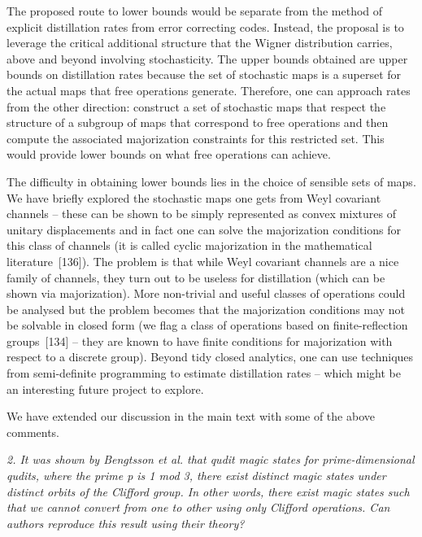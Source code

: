 \documentclass[11pt]{letter}
\begin{document}
The proposed route to lower bounds would be separate from the method of explicit distillation rates from error correcting codes.  Instead, the proposal is to leverage the critical additional structure that the Wigner distribution carries,  above and beyond involving stochasticity.  The upper bounds obtained are upper bounds on distillation rates because the set of stochastic maps is a superset for the actual maps that free operations generate.  
Therefore, one can approach rates from the other direction: construct a set of stochastic maps that respect the structure of a subgroup of maps that correspond to free operations and then compute the associated majorization constraints for this restricted set. This would provide lower bounds on what free operations can achieve. 

The difficulty in obtaining lower bounds lies in the choice of sensible sets of maps. 
We have briefly explored the stochastic maps one gets from Weyl covariant channels -- these can be shown to be simply represented as convex mixtures of unitary displacements and in fact one can solve the majorization conditions for this class of channels (it is called cyclic majorization in the mathematical literature~[136]). The problem is that while Weyl covariant channels are a nice family of channels,  they turn out to be useless for distillation (which can be shown via majorization). 
More non-trivial and useful classes of operations could be analysed but the problem becomes that the majorization conditions may not be solvable in closed form (we flag a class of operations based on finite-reflection groups~[134] -- they are known to have finite conditions for majorization with respect to a discrete group). Beyond tidy closed analytics, one can use techniques from semi-definite programming to estimate distillation rates -- which might be an interesting future project to explore.

We have extended our discussion in the main text with some of the above comments.

\textit{2. It was shown by Bengtsson et al. that qudit magic states for prime-dimensional qudits, where the prime p is 1 mod 3, there exist distinct magic states under distinct orbits of the Clifford group. In other words, there exist magic states such that we cannot convert from one to other using only Clifford operations. Can authors reproduce this result using their theory?}
\end{document}
